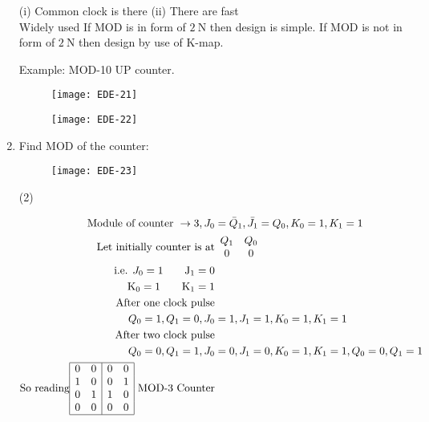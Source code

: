 \begin{enumerate}
\begin{answer}
 		(i) Common clock is there (ii) There are fast\\
 		Widely used If MOD is in form of $2 \mathrm{~N}$ then design is simple. If MOD is not in form of $2 \mathrm{~N}$ then design by use of K-map.
 	\end{answer}
	Example: MOD-10 UP counter.
	\begin{figure}[H]
		\centering
		\texttt{[image: EDE-21]}
	\end{figure}
\begin{figure}[H]
	\centering
	\texttt{[image: EDE-22]}
\end{figure}
 	\item Find MOD of the counter:
 	\begin{figure}[H]
 		\centering
 		\texttt{[image: EDE-23]}
 	\end{figure}
 	 \begin{tasks}(2)
 	\end{tasks}
 	\begin{answer}
 		\begin{align*}
 		\text { Module of counter } \rightarrow 3, J_{0}&=\bar{Q}_{1}, \bar{J}_{1}=Q_{0}, K_{0}=1, K_{1}=1\\
 	\text{	Let initially counter is at}&
 		\begin{array}{cc}Q_{1} & Q_{0} \\ 0 & 0\end{array}\\
 		\text{i.e. }J_{0}=1
 		\qquad\mathrm{J}_{1}=0\\
 		\mathrm{K}_{0}=1
 		\qquad\mathrm{K}_{1}=1\\
 		\text{After one clock pulse}\\
 		Q_{0}=1, Q_{1}=0, J_{0}&=1, J_{1}=1, K_{0}=1, K_{1}=1\\
 		\text{After two clock pulse}\\
 		Q_{0}=0, Q_{1}=1, J_{0}&=0, J_{1}=0, K_{0}=1, K_{1}=1, Q_{0}=0, Q_{1}=1\\
 		\text{So reading}\begin{array}{|ll|ll|}
 		\hline 0 & 0 & 0 & 0 \\
 		1 & 0 & 0 & 1 \\
 		0 & 1 & 1 & 0 \\
 		0 & 0 & 0 & 0 \\
 		\hline
 		\end{array}\text{ MOD-3 Counter}

\end{align*}
\end{answer}
\end{enumerate}
